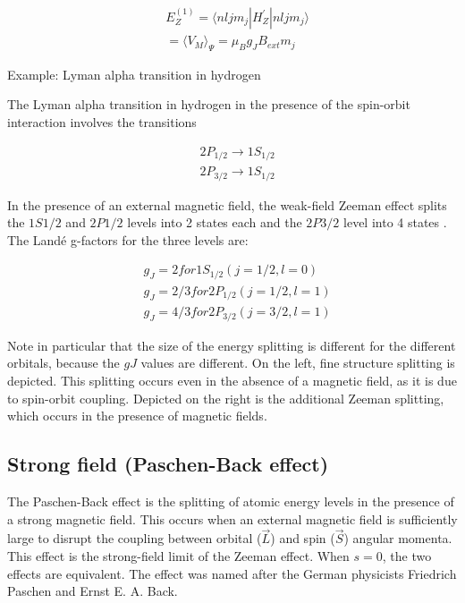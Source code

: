 \begin{align*}
&E_Z^{(1)} = \langle nljm_j |H_Z^{'}|nljm_j \rangle\\
&= \langle V_M \rangle_{\Psi} = \mu_B g_J B_{ext} m_j
\end{align*}

Example: Lyman alpha transition in hydrogen

The Lyman alpha transition in hydrogen in the presence of the spin-orbit interaction involves the transitions

\begin{align*}
&2P_{1/2} \to 1S_{1/2}\\
&2P_{3/2} \to 1S_{1/2}
\end{align*}

In the presence of an external magnetic field, the weak-field Zeeman effect splits the $1S1/2$ and $2P1/2$ levels into 2 states each  and the $2P3/2$ level into 4 states . The Land\'e g-factors for the three levels are:

\begin{align*}
&g_J = 2 for 1S_{1/2} (j=1/2, l=0)\\
&g_J = 2/3 for 2P_{1/2} (j=1/2, l=1)\\
&g_J = 4/3 for 2P_{3/2} (j=3/2, l=1)
\end{align*}

Note in particular that the size of the energy splitting is different for the different orbitals, because the $gJ$ values are different. On the left, fine structure splitting is depicted. This splitting occurs even in the absence of a magnetic field, as it is due to spin-orbit coupling. Depicted on the right is the additional Zeeman splitting, which occurs in the presence of magnetic fields.

\subsection{Strong field (Paschen-Back effect)}

The Paschen-Back effect is the splitting of atomic energy levels in the presence of a strong magnetic field. This occurs when an external magnetic field is sufficiently large to disrupt the coupling between orbital ($\vec{L}$) and spin ($\vec{S}$) angular momenta. This effect is the strong-field limit of the Zeeman effect. When $s = 0$, the two effects are equivalent. The effect was named after the German physicists Friedrich Paschen and Ernst E. A. Back.

